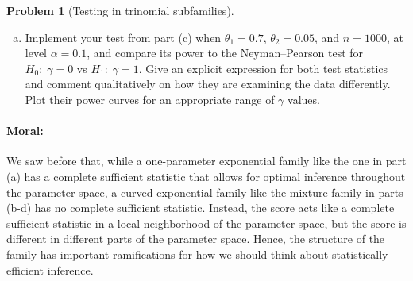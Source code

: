 \documentclass{article}
\theoremstyle{definition}
\newtheorem{problem}{Problem}
\begin{document}
\begin{problem}[Testing in trinomial subfamilies]
\begin{enumerate}[(a)]
      


    \item Implement your test from part (c) when $\theta_1 = 0.7$, $\theta_2=0.05$, and $n=1000$, at level $\alpha = 0.1$, and compare its power to the Neyman--Pearson test for $H_0:\;\gamma = 0$ vs $H_1:\;\gamma = 1$. Give an explicit expression for both test statistics and comment qualitatively on how they are examining the data differently. Plot their power curves for an appropriate range of $\gamma$ values.

      

  \end{enumerate}

  \paragraph{Moral:} We saw before that, while a one-parameter exponential family like the one in part (a) has a complete sufficient statistic that allows for optimal inference throughout the parameter space, a curved exponential family like the mixture family in parts (b-d) has no complete sufficient statistic. Instead, the score acts like a complete sufficient statistic in a local neighborhood of the parameter space, but the score is different in different parts of the parameter space.  Hence, the structure of the family has important ramifications for how we should think about statistically efficient inference.

\end{problem}
\end{document}
